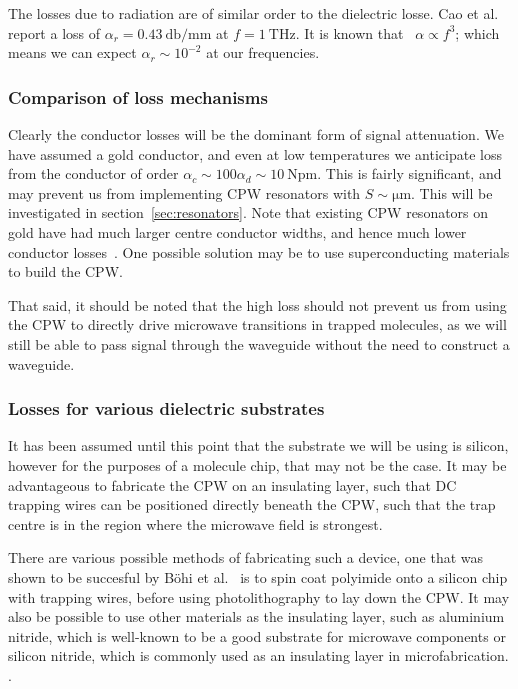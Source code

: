 The losses due to radiation are of similar order to the dielectric losse. Cao et
al.~\cite{L.Cao2013} report a loss of $\alpha_r = \SI{0.43}{\decibel \per \milli
\meter}$ at $f=\SI{1}{\tera\hertz}$. It is known that~\cite{81658} $\alpha
\propto f^3$; which means we can expect $\alpha_r \sim 10^{-2}$  at
our frequencies.

\subsubsection*{Comparison of loss mechanisms}

Clearly the conductor losses will be the dominant form of signal attenuation. We
have assumed a gold conductor, and even at low temperatures we anticipate loss
from the conductor of order $\alpha_c \sim 100 \alpha_d \sim
\SI{10}{\neper\meter}$. This is fairly significant, and may prevent us from
implementing CPW resonators with $S\sim\si{\micro\meter}$. This will be
investigated in section~\ref{sec:resonators}. Note that existing
CPW resonators on gold have had much larger centre conductor widths, and hence
much lower conductor losses~\cite{1127105}. One possible solution may be to use
superconducting materials to build the CPW.

That said, it should be noted that the high loss should not prevent us from
using the CPW to directly drive microwave transitions in trapped molecules, as
we will still be able to pass signal through the waveguide without the need to
construct a waveguide.


\subsubsection{Losses for various dielectric substrates}

It has been assumed until this point that the substrate we will be using is
silicon, however for the purposes of a molecule chip, that may not be the case.
It may be advantageous to fabricate the CPW on an insulating layer, such that
DC trapping wires can be positioned directly beneath the CPW, such that the trap
centre is in the region where the microwave field is strongest.

There are various possible methods of fabricating such a device, one that was
shown to be succesful by B\"ohi et al.~\cite{Boehi2009} is to spin coat
polyimide onto a silicon chip with trapping wires, before using photolithography
to lay down the CPW. It may also be possible to use other materials as the
insulating layer, such as aluminium nitride, which is well-known to be a good
substrate for microwave components  or silicon nitride, which is
commonly used as an insulating layer in microfabrication. .


